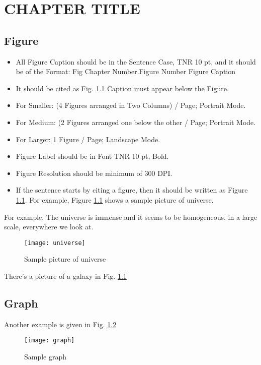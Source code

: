 \chapter{CHAPTER TITLE} \label{c6}
\section{Figure}
\begin{itemize}
	\item All Figure Caption should be in the Sentence Case, TNR 10 pt, and it should be of the Format: Fig Chapter Number.Figure Number Figure Caption
	
	\item It should be cited as Fig. \ref{c6:fig1} 
	Caption must appear below the Figure.

	
	\item For Smaller: (4 Figures arranged in Two Columns) / Page; Portrait Mode.
	
	\item For Medium: (2 Figures arranged one below the other / Page; Portrait Mode.
	
	\item For Larger: 1 Figure / Page; Landscape Mode.
	
	\item Figure Label should be in Font TNR 10 pt, Bold.
	
	\item Figure Resolution should be minimum of 300 DPI.
   
    \item If the sentence starts by citing a figure, then it should be written as Figure \ref{c6:fig1}. For example, Figure \ref{c6:fig1} shows a sample picture of universe.



\end{itemize}

For example, The universe is immense and it seems to be homogeneous, 
in a large scale, everywhere we look at.

	\begin{figure}[htb]
		\begin{center}
		\texttt{[image: universe]}
	
		\caption{Sample picture of universe }
		\label{c6:fig1}
	\end{center}
	\end{figure}

There's a picture of a galaxy in Fig. \ref{c6:fig1}

\section{Graph}
Another example is given in Fig. \ref{c6:fig2}

	\begin{figure}[htb]
		\begin{center}
		\texttt{[image: graph]}
	
		\caption{Sample graph }
		\label{c6:fig2}
	\end{center}
	\end{figure}

